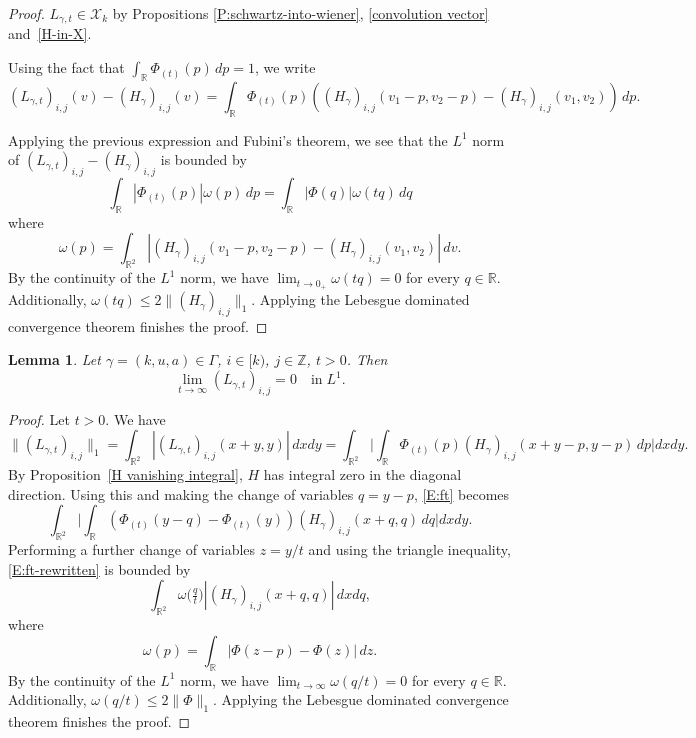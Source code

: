 \documentclass[12pt,reqno]{amsart}
\theoremstyle{plain}
\newtheorem{lemma}[theorem]{Lemma}
\numberwithin{equation}{section}
\theoremstyle{remark}
\newcommand{\uses}[1]{}
\newcommand{\usesdefs}[1]{}
\newcommand{\Z}{{\mathbb Z}}
\newcommand{\R}{{\mathbb R}}
\begin{document}
\begin{proof}
$L_{\gamma,t} \in \mathcal{X}_k$ by Propositions \ref{P:schwartz-into-wiener}, \ref{convolution vector}  and~\ref{H-in-X}.

Using the fact that $\int_{\R} \Phi_{(t)}(p)\,dp=1$, we write
\[
(L_{\gamma,t})_{i,j}(v)-(H_{\gamma})_{i,j}(v)
=\int_{\R} \Phi_{(t)}(p) ((H_\gamma)_{i,j}(v_1-p,v_2-p)-(H_\gamma)_{i,j}(v_1,v_2))\,dp.
\]

Applying the previous expression and Fubini's theorem, we see that the $L^1$ norm of $(L_{\gamma,t})_{i,j}-(H_{\gamma})_{i,j}$ is bounded by
\[
\int_{\R} |\Phi_{(t)}(p)| \omega(p)\,dp
=\int_{\R} |\Phi(q)| \omega(tq)\,dq
\]
where
\[
\omega(p)=\int_{\R^2} |(H_\gamma)_{i,j}(v_1-p,v_2-p)-(H_\gamma)_{i,j}(v_1,v_2)|\,dv.
\]
By the continuity of the $L^1$ norm, we have $\lim_{t\to 0_+} \omega(tq)=0$ for every $q\in \R$. Additionally, $\omega(tq) \leq 2\|(H_{\gamma})_{i,j}\|_1$. Applying the Lebesgue dominated convergence theorem finishes the proof.
\end{proof}

\begin{lemma}\label{L:ft-infty}\uses{H vanishing integral}\usesdefs{standard bump,geometric parameters,H multiplier,auto:L-kernel-definition}
Let $\gamma=(k,u,a)\in \Gamma$, $i\in [k)$, $j\in \Z$, $t>0$. Then
\begin{equation}\label{auto:L-kernel-large-scale-limit}
\lim_{t\to \infty} (L_{\gamma,t})_{i,j} = 0 \quad\text{in}\;L^1.
\end{equation}
\end{lemma}

\begin{proof}
Let $t>0$. We have
\begin{equation}\label{E:ft}
\|(L_{\gamma,t})_{i,j}\|_{1}
=\int_{\R^2} |(L_{\gamma,t})_{i,j}(x+y,y)|\,dx dy
=\int_{\R^2} \Big|\int_{\R} \Phi_{(t)}(p) (H_\gamma)_{i,j}(x+y-p,y-p)\,dp\Big| dx dy.
\end{equation}
By Proposition~\ref{H vanishing integral}, $H$ has integral zero in the diagonal direction. Using this and making the change of variables $q=y-p$, \eqref{E:ft} becomes
\begin{equation}\label{E:ft-rewritten}
\int_{\R^2} \Big|\int_{\R} (\Phi_{(t)}(y-q)-\Phi_{(t)}(y)) (H_\gamma)_{i,j}(x+q,q)\,dq\Big| dx dy.
\end{equation}
Performing a further change of variables $z=y/t$ and using the triangle inequality, \eqref{E:ft-rewritten} is bounded by
\[
\int_{\R^2} \omega\Big(\tfrac{q}{t}\Big) |(H_\gamma)_{i,j}(x+q,q)|\,dx dq,
\]
where
\[
\omega(p)=\int_{\R}|\Phi(z-p)-\Phi(z)|\,dz.
\]
By the continuity of the $L^1$ norm, we have $\lim_{t\to \infty} \omega(q/t)=0$ for every $q\in \R$. Additionally, $\omega(q/t) \leq 2\|\Phi\|_1$. Applying the Lebesgue dominated convergence theorem finishes the proof.
\end{proof}
\end{document}
